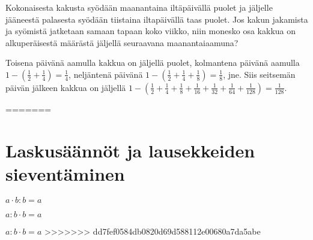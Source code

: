 \begin{tehtava}
Kokonaisesta kakusta syödään maanantaina iltäpäivällä puolet ja jäljelle jääneestä palasesta syödään tiistaina 	iltapäivällä taas puolet. Jos kakun jakamista ja syömistä jatketaan samaan tapaan koko viikko, niin monesko 
osa kakkua on alkuperäisestä määrästä jäljellä seuraavana maanantaiaamuna?
\begin{vastaus}
Toisena päivänä aamulla kakkua on jäljellä puolet, kolmantena päivänä aamulla $1-(\frac{1}{2}+\frac{1}{4})=\frac{1}{4}$, 
neljäntenä päivänä $1-(\frac{1}{2}+\frac{1}{4}+\frac{1}{8})=\frac{1}{8}$, jne. Siis seitsemän päivän jälkeen kakkua 
on jäljellä $1-(\frac{1}{2}+\frac{1}{4}+\frac{1}{8}+\frac{1}{16}+\frac{1}{32}+\frac{1}{64}+\frac{1}{128})=\frac{1}{128}$.  
\end{vastaus}
\end{tehtava}

=======
\chapter{Laskusäännöt ja lausekkeiden sieventäminen}



$a\cdot b:b=a$

$a:b\cdot b=a$

$a:b\cdot b=a$
>>>>>>> dd7fef0584db0820d69d588112e00680a7da5abe
